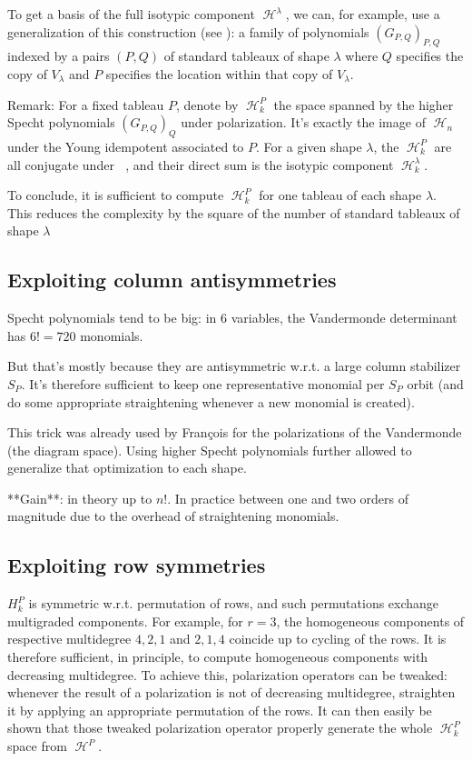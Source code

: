 \documentclass[letter,12pt]{article}
\DeclareMathOperator{\Sn}{\mathbb{S}_n}
\DeclareMathOperator{\harmonics}{\mathcal{H}}
\begin{document}
	To get a basis of the full isotypic component $\harmonics^\lambda$, we can, for example, use a generalization of this construction (see \cite{Ariki1997}): a family of polynomials $(G_{P,Q})_{P,Q}$ indexed by a pairs $(P,Q)$ of standard tableaux of shape $\lambda$ where $Q$ specifies the copy of $V_\lambda$ and $P$ specifies the location within that copy of $V_\lambda$.
	
	
	Remark: For a fixed tableau $P$, denote by $\harmonics_k^P$ the space spanned by the higher Specht polynomials $(G_{P,Q})_Q$ under polarization. It's exactly the image of $\harmonics_n$ under the Young idempotent associated to $P$. For a given shape $\lambda$, the $\harmonics_k^P$ are all conjugate under $\Sn$, and their direct sum is the isotypic component $\harmonics_k^\lambda$.
	
	To conclude, it is sufficient to compute $\harmonics_k^P$ for one tableau of each shape $\lambda$. This reduces the complexity by the square of the number of standard tableaux of shape $\lambda$
	
	\subsection{Exploiting column antisymmetries}
	
	Specht polynomials tend to be big: in $6$ variables, the Vandermonde determinant has $6!=720$ monomials.
	
	But that's mostly because they are antisymmetric w.r.t. a large column stabilizer $S_P$. It's therefore sufficient to keep one representative monomial per $S_P$ orbit (and do some appropriate straightening whenever a new monomial is created). 
	
	This trick was already used by François for the polarizations of the Vandermonde (the diagram space). Using higher Specht polynomials further allowed  to generalize that optimization to each shape.
	
	**Gain**: in theory up to $n!$. In practice between one and two orders of magnitude due to the overhead of straightening monomials.
	
	\subsection{Exploiting row symmetries}
	
	$H_k^P$ is symmetric w.r.t. permutation of rows, and such permutations
	exchange multigraded components. For example, for $r=3$, the homogeneous components of respective multidegree $4,2,1$ and $2,1,4$ coincide
	up to cycling of the rows. It is therefore sufficient, in principle, to compute homogeneous components with decreasing multidegree.
	To achieve this, polarization operators can be tweaked: whenever the result of a polarization is not of decreasing multidegree, straighten it by applying an appropriate permutation of the rows. It can then easily be shown that those tweaked polarization operator properly generate the whole $\harmonics_k^P$ space from $\harmonics^P$.
	
\end{document}

